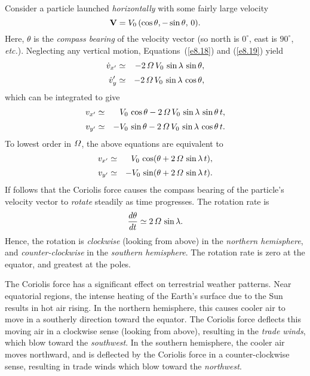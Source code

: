 Consider a particle launched {\em horizontally}\/ with some fairly large velocity
\begin{equation}
{\bf V} = V_0\,(\cos\theta,-\sin\theta,\,0).
\end{equation}
 Here, $\theta$ is the {\em compass
bearing}\/ of the velocity vector (so north is $0^\circ$, east is $90^\circ$, {\em etc.}). Neglecting any vertical motion, Equations~(\ref{e8.18}) and (\ref{e8.19}) yield
\begin{eqnarray}
\dot{v}_{x'} &\simeq& -2\,{\mit\Omega}\,V_0\,\sin\lambda\,\sin\theta,\\[0.5ex]
\dot{v}_{y}' &\simeq& -2\,{\mit\Omega}\,V_0\,\sin\lambda\,\cos\theta,
\end{eqnarray}
which can be integrated to give
\begin{eqnarray}
v_{x'}&\simeq& V_0\,\cos\theta -2\,{\mit\Omega}\,V_0\,\sin\lambda\,\sin\theta\,t,\\[0.5ex]
v_{y'}&\simeq&- V_0\,\sin\theta - 2\,{\mit\Omega}\,V_0\,\sin\lambda\,\cos\theta\,t.
\end{eqnarray}
To lowest order in ${\mit\Omega}$, the above equations are equivalent to
\begin{eqnarray}
v_{x'} &\simeq& V_0\,\cos(\theta +2\,{\mit\Omega}\,\sin\lambda\,t),\\[0.5ex]
v_{y'} &\simeq& -V_0\,\sin(\theta+2\,{\mit\Omega}\,\sin\lambda\,t).
\end{eqnarray}
If follows that the Coriolis force causes the compass
bearing of the particle's velocity vector to {\em rotate}\/ steadily as time progresses. The rotation rate is
\begin{equation}
\frac{d\theta}{dt} \simeq 2\,{\mit\Omega}\,\sin\lambda.
\end{equation}
Hence, the rotation is {\em clockwise}\/ (looking from above) in the
{\em northern hemisphere}, and {\em counter-clockwise}\/ in the
{\em southern  hemisphere}. The rotation rate is zero at the equator, and
greatest at the poles. 

The Coriolis force has a significant effect on terrestrial weather patterns. 
Near equatorial regions, the intense heating  of the Earth's surface due to the Sun results in hot
air rising. In the northern hemisphere, this causes cooler air to
move in a southerly direction toward the equator. The Coriolis
force deflects this moving air in a clockwise sense (looking from above),
resulting in the {\em trade winds}, which blow toward the {\em southwest}.
In the southern hemisphere, the cooler air moves northward, and
is deflected by the Coriolis force in a counter-clockwise sense, resulting
in trade winds which blow toward the {\em northwest}. 

